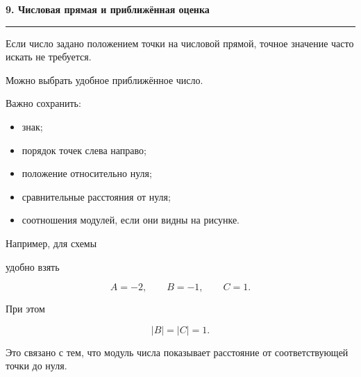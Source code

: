 \documentclass[a4paper,12pt]{article}
\newcommand{\topic}[1]{%
    \par\vspace{0.9em}%
    {\Large\bfseries\color{darkaccent}#1}\par
    \vspace{0.25em}
    \noindent
    \color{accent}\rule{\linewidth}{0.6pt}
    \color{black}
    \vspace{0.55em}
}
\begin{document}

\topic{9. Числовая прямая и приближённая оценка}

Если число задано положением точки на числовой прямой,
точное значение часто искать не требуется.

Можно выбрать удобное приближённое число.

Важно сохранить:

\begin{itemize}
    \item знак;
    \item порядок точек слева направо;
    \item положение относительно нуля;
    \item сравнительные расстояния от нуля;
    \item соотношения модулей, если они видны на рисунке.
\end{itemize}

Например, для схемы

\begin{center}
\end{center}

удобно взять

\[
A=-2,\qquad B=-1,\qquad C=1.
\]

При этом

\[
|B|=|C|=1.
\]

Это связано с тем, что модуль числа показывает расстояние
от соответствующей точки до нуля.

\end{document}
